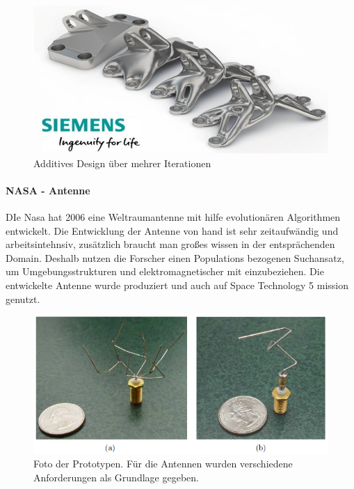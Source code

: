 \noindent%
\begin{figure}[H]
  \centering  
  \includegraphics[scale=0.3]{img/Additive.png}
  \caption{Additives Design über mehrer Iterationen}
  \label{fig:Ablauf_kurz}
\end{figure}

\paragraph{NASA - Antenne}
DIe Nasa hat 2006 eine Weltraumantenne mit hilfe evolutionären Algorithmen entwickelt. Die Entwicklung der Antenne von hand ist sehr zeitaufwändig und arbeitsintehnsiv, zusätzlich braucht man großes wissen in der entsprächenden Domain. Deshalb nutzen die Forscher einen Populations bezogenen Suchansatz, um Umgebungsstrukturen und  elektromagnetischer mit einzubeziehen. Die entwickelte Antenne wurde produziert und auch auf Space Technology 5 mission genutzt.
\cite{AutomatedAntenna}
\noindent%
\begin{figure}[H]
  \centering  
  \includegraphics[scale=0.5]{img/nasa-antenne.png}
  \caption{Foto der Prototypen. Für die Antennen wurden verschiedene Anforderungen als Grundlage gegeben. \cite{AutomatedAntenna}}
  \label{fig:Ablauf_kurz}
\end{figure}



